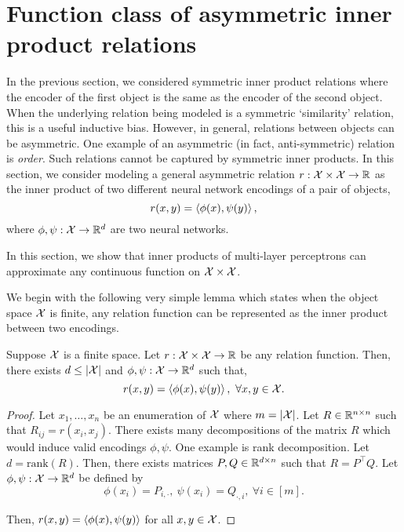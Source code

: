 \section{Function class of asymmetric inner product relations}\label{sec:asymmetric_relations}

In the previous section, we considered symmetric inner product relations where the encoder of the first object is the same as the encoder of the second object. When the underlying relation being modeled is a symmetric `similarity' relation, this is a useful inductive bias. However, in general, relations between objects can be asymmetric. One example of an asymmetric (in fact, anti-symmetric) relation is \textit{order}. Such relations cannot be captured by symmetric inner products. In this section, we consider modeling a general asymmetric relation $r: {\mathcal{X}} \times {\mathcal{X}} \to \mathbb{R}$ as the inner product of two different neural network encodings of a pair of objects,
\begin{equation}\label{eq:asymmetric_iprod_relation}
    r(x, y) = \iprod{\phi(x)}{\psi(y)},
\end{equation}
where $\phi, \psi: {\mathcal{X}} \to \mathbb{R}^d$ are two neural networks.

In this section, we show that inner products of multi-layer perceptrons can approximate any continuous function on ${\mathcal{X}} \times {\mathcal{X}}$.

We begin with the following very simple lemma which states when the object space ${\mathcal{X}}$ is finite, any relation function can be represented as the inner product between two encodings.

\begin{lemma}\label{lemma:finite_space_rel}
    Suppose ${\mathcal{X}}$ is a finite space. Let $r: {\mathcal{X}} \times {\mathcal{X}} \to \mathbb{R}$ be any relation function. Then, there exists $d \leq \left\lvert{\mathcal{X}}\right\rvert$ and $\phi, \psi: {\mathcal{X}} \to \mathbb{R}^{d}$ such that,
    \begin{equation*}
        r(x, y) = \iprod{\phi(x)}{\psi(y)}, \ \forall x, y \in \calX.
    \end{equation*}
\end{lemma}

\begin{proof}
    Let $x_1, \ldots, x_n$ be an enumeration of ${\mathcal{X}}$ where $m = \left\lvert{\mathcal{X}}\right\rvert$. Let $R \in \mathbb{R}^{n \times n}$ such that $R_{ij} = r(x_i, x_j)$. There exists many decompositions of the matrix $R$ which would induce valid encodings $\phi, \psi$. One example is rank decomposition. Let $d = \mathrm{rank}(R)$. Then, there exists matrices $P, Q \in \mathbb{R}^{d \times n}$ such that $R = P^\top Q$. Let $\phi, \psi: {\mathcal{X}} \to \mathbb{R}^{d}$ be defined by
    \begin{equation}
        \phi(x_i) = P_{i, \cdot}, \ \psi(x_i) = Q_{\cdot, i}, \ \forall i \in [m].
    \end{equation}

    Then, $r(x, y) = \left \langle \phi(x), \psi(y) \right\rangle$ for all $x, y \in {\mathcal{X}}$.
\end{proof}

